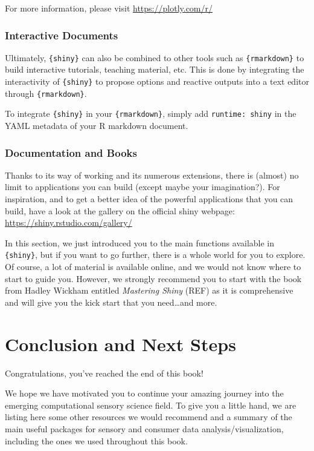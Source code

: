 \documentclass[
]{krantz}
\begin{document}
For more information, please visit \url{https://plotly.com/r/}

\hypertarget{interactive-documents}{%
\subsection{Interactive Documents}\label{interactive-documents}}

Ultimately, \texttt{\{shiny\}} can also be combined to other tools such as \texttt{\{rmarkdown\}} to build interactive tutorials, teaching material, etc. This is done by integrating the interactivity of \texttt{\{shiny\}} to propose options and reactive outputs into a text editor through \texttt{\{rmarkdown\}}.

To integrate \texttt{\{shiny\}} in your \texttt{\{rmarkdown\}}, simply add \texttt{runtime:\ shiny} in the YAML metadata of your R markdown document.

\hypertarget{documentation-and-books}{%
\subsection{Documentation and Books}\label{documentation-and-books}}

Thanks to its way of working and its numerous extensions, there is (almost) no limit to applications you can build (except maybe your imagination?). For inspiration, and to get a better idea of the powerful applications that you can build, have a look at the gallery on the official shiny webpage:
\url{https://shiny.rstudio.com/gallery/}

In this section, we just introduced you to the main functions available in \texttt{\{shiny\}}, but if you want to go further, there is a whole world for you to explore. Of course, a lot of material is available online, and we would not know where to start to guide you. However, we strongly recommend you to start with the book from Hadley Wickham entitled \emph{Mastering Shiny} (REF) as it is comprehensive and will give you the kick start that you need\ldots and more.

\hypertarget{next-steps}{%
\chapter{Conclusion and Next Steps}\label{next-steps}}

Congratulations, you've reached the end of this book!

We hope we have motivated you to continue your amazing journey into the emerging computational sensory science field. To give you a little hand, we are listing here some other resources we would recommend and a summary of the main useful packages for sensory and consumer data analysis/visualization, including the ones we used throughout this book.
\end{document}

